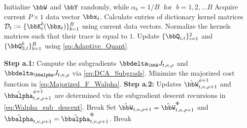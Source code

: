 \documentclass[10pt,final]{IEEEtran}
\begin{document}
\begin{algorithm} \label{alg_1}
\begin{algorithmic}[1]
\STATE Initialize $\bbW$ and $\bbY$ randomly, while \begin{math}\alpha_b = 1/B\;\textrm{ for }\;b=1,2,...B\end{math}
   \STATE Acquire current $P\times 1$ data vector $\bbx_{t}$.
   \STATE Calculate entries of dictionary kernel matrices ${\cal D}_t:=\{\bbK_t^b(\bbx_t)\}_{b=1}^B$ using current data vectors. Normalize the kernels matrices such that their trace is equal to $1$.
	\STATE Update $\{\bbQ_{i,t}\}_{i=1}^2$ and $\{\bbQ_{3,t}^b\}_{b=1}^B$ using \eqref{eq:Adaptive_Quant}.
        
		\STATE \textbf{Step a.1:}  Compute the subgradients $\bbdelta_{\bbW}J_{t,\kappa,\rho}$
              and $\bbdelta_{\bbalpha} J_{t,\kappa,\rho}$ via 
              \eqref{eq:DCA_Subgrads}.
		\STATE Minimize the majorized cost function in 
		\eqref{eq:Majorized_F_Walpha}.
	       \STATE \textbf{Step a.2:} Updates 
  $\hat{\bbW}_{t,\kappa,\rho+1}^{\phi+1}$ and 
  $\hat{\bbalpha}_{t,\kappa,\rho+1}^{\phi+1}$ are determined via the subgradient descent recursions in \eqref{eq:Walpha_sub_descent}.
		        \STATE Break
		    \ENDIF
	       \ENDFOR
		    \STATE Set $\hat{\bbW}_{t,\kappa,\rho+1}=\hat{\bbW}_{t,\kappa,\rho+1}^{\Phi}$ and $\hat{\bbalpha}_{t,\kappa,\rho+1}=\hat{\bbalpha}_{t,\kappa,\rho+1}^{\Phi}$.
		    \STATE Break
		    \ENDIF
      \ENDFOR
      

\end{algorithmic}
\end{algorithm}
\end{document}
